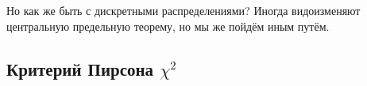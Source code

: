 Но как же быть с дискретными распределениями? Иногда видоизменяют центральную
предельную теорему, но мы же пойдём иным путём.

\subsection{Критерий Пирсона $\chi^2$}
